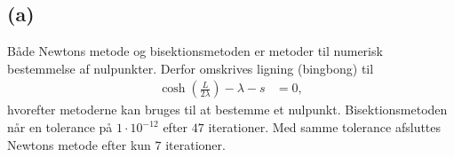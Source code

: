 \subsection*{(a)}
%
Både Newtons metode og bisektionsmetoden er metoder til numerisk bestemmelse af nulpunkter.
Derfor omskrives ligning (bingbong) til
%
\begin{align*}
\cosh( \frac{L}{2\lambda}) - \lambda - s &= 0,
\end{align*}
%
hvorefter metoderne kan bruges til at bestemme et nulpunkt.
Bisektionsmetoden når en tolerance på $1\cdot 10^{-12}$ efter $47$ iterationer.
Med samme tolerance afsluttes Newtons metode efter kun $7$ iterationer.